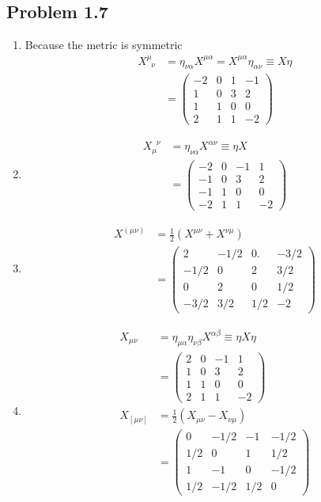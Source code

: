 \documentclass[10pt,a4paper]{book}
\theoremstyle{definition}
\begin{document}
\subsection{Problem 1.7}
\begin{enumerate}
\item Because the metric is symmetric
\begin{align}
 X^\mu_{\;\;\nu}&=\eta_{\nu\alpha}X^{\mu\alpha}=X^{\mu\alpha}\eta_{\alpha\nu}\equiv X\eta\\
 &=\begin{pmatrix}
-2 & 0 & 1 & -1\\
1 & 0 & 3 &  2\\
1 & 1 & 0 & 0\\
2 & 1 & 1 & -2
\end{pmatrix}
\end{align}

\item
\begin{align}
 X_\mu^{\;\;\nu}&=\eta_{\nu\alpha}X^{\alpha\nu}\equiv\eta X\\
 &=\begin{pmatrix}
-2 & 0 & -1 & 1\\
-1 & 0 & 3 &  2\\
-1 & 1 & 0 & 0\\
-2 & 1 & 1 & -2
\end{pmatrix}
\end{align}

\item 
\begin{align}
X^{(\mu\nu)}&=\frac{1}{2}(X^{\mu\nu}+X^{\nu\mu})\\
&=\begin{pmatrix}
2     & -1/2 & 0.  & -3/2\\
-1/2 & 0    & 2   &  3/2\\
0     & 2    & 0   & 1/2\\
-3/2 & 3/2 & 1/2 & -2
\end{pmatrix}
\end{align}

\item 
\begin{align}
X_{\mu\nu}&=\eta_{\mu\alpha}\eta_{\nu\beta}X^{\alpha\beta}\equiv\eta X\eta\\
&=\begin{pmatrix}
2 & 0 & -1 & 1\\
1 & 0 & 3 &  2\\
1 & 1 & 0 & 0\\
2 & 1 & 1 & -2
\end{pmatrix}\\
X_{[\mu\nu]}&=\frac{1}{2}(X_{\mu\nu}-X_{\nu\mu})\\
&=\begin{pmatrix}
0    & -1/2 & -1  & -1/2\\
1/2 & 0    & 1  &  1/2\\
1    & -1    & 0   & -1/2\\
1/2 & -1/2 & 1/2 & 0
\end{pmatrix}
\end{align}


\end{enumerate}
\end{document}
